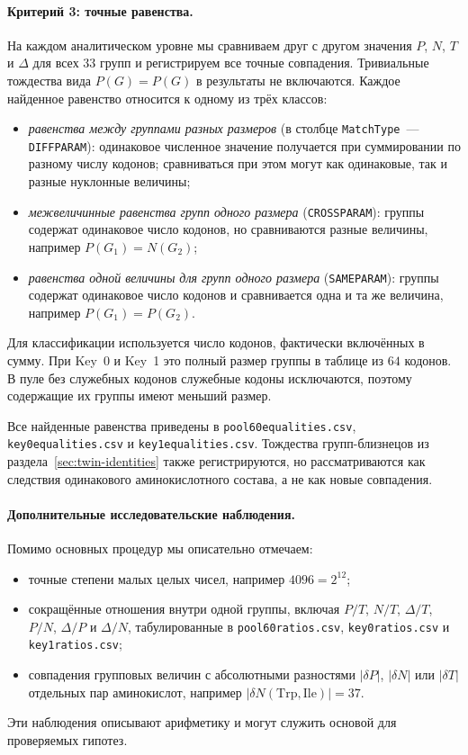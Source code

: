 \documentclass[11pt,a4paper]{article}
\renewcommand{\_}{\origunderscore\allowbreak}
\begin{document}
\paragraph{Критерий 3: точные равенства.}
На каждом аналитическом уровне мы сравниваем друг с другом значения
$P$, $N$, $T$ и $\Delta$ для всех $33$ групп и регистрируем все точные
совпадения. Тривиальные тождества вида $P(G)=P(G)$ в результаты не
включаются. Каждое найденное равенство относится к одному из трёх
классов:
\begin{itemize}
  \item \emph{равенства между группами разных размеров}
        (в столбце \texttt{Match\_Type}~--- \texttt{DIFF\_PARAM}):
        одинаковое численное значение получается при суммировании по
        разному числу кодонов; сравниваться при этом могут как
        одинаковые, так и разные нуклонные величины;
  \item \emph{межвеличинные равенства групп одного размера}
        (\texttt{CROSS\_PARAM}): группы содержат одинаковое число
        кодонов, но сравниваются разные величины, например
        $P(G_1)=N(G_2)$;
  \item \emph{равенства одной величины для групп одного размера}
        (\texttt{SAME\_PARAM}): группы содержат одинаковое число
        кодонов и сравнивается одна и та же величина, например
        $P(G_1)=P(G_2)$.
\end{itemize}

Для классификации используется число кодонов, фактически включённых в
сумму. При Key~0 и Key~1 это полный размер группы в таблице из $64$
кодонов. В пуле без служебных кодонов служебные кодоны исключаются,
поэтому содержащие их группы имеют меньший размер.

Все найденные равенства приведены в
\texttt{pool60\_equalities.csv},
\texttt{key0\_equalities.csv} и
\texttt{key1\_equalities.csv}. Тождества групп-близнецов из
раздела~\ref{sec:twin-identities} также регистрируются, но рассматриваются
как следствия одинакового аминокислотного состава, а не как новые
совпадения.

\paragraph{Дополнительные исследовательские наблюдения.}
Помимо основных процедур мы описательно отмечаем:
\begin{itemize}
  \item точные степени малых целых чисел, например
        $4096=2^{12}$;
  \item сокращённые отношения внутри одной группы, включая
        $P/T$, $N/T$, $\Delta/T$, $P/N$, $\Delta/P$ и $\Delta/N$,
        табулированные в
        \texttt{pool60\_ratios.csv},
        \texttt{key0\_ratios.csv} и
        \texttt{key1\_ratios.csv};
  \item совпадения групповых величин с абсолютными разностями
        $|\delta P|$, $|\delta N|$ или $|\delta T|$ отдельных пар
        аминокислот, например $|\delta N(\mathrm{Trp},\mathrm{Ile})|
        =37$.
\end{itemize}
Эти наблюдения описывают арифметику и могут служить основой для
проверяемых гипотез.
\end{document}
